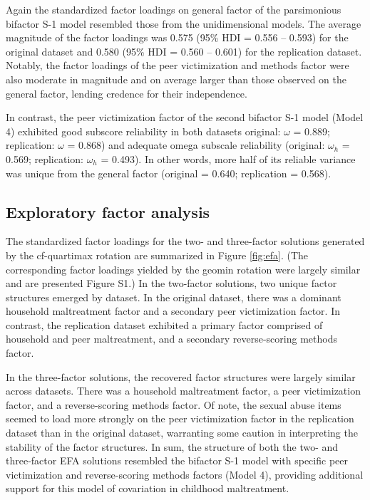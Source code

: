 \documentclass[letterpaper,man,natbib]{apa6}  %
\begin{document}
Again the standardized factor loadings on general factor of the parsimonious bifactor S-1 model resembled those from the unidimensional models. The average magnitude of the factor loadings was 0.575 (95\% HDI = 0.556 -- 0.593) for the original dataset and 0.580 (95\% HDI = 0.560 -- 0.601) for the replication dataset. Notably, the factor loadings of the peer victimization and methods factor were also moderate in magnitude and on average larger than those observed on the general factor, lending credence for their independence. 

In contrast, the peer victimization factor of the second bifactor S-1 model (Model 4) exhibited good subscore reliability in both datasets original: $\omega$ = 0.889; replication: $\omega$ = 0.868) and adequate omega subscale reliability (original: $\omega_h$ = 0.569; replication: $\omega_h$ = 0.493). In other words, more half of its reliable variance was unique from the general factor (original = 0.640; replication = 0.568). 

\subsection{Exploratory factor analysis}

The standardized factor loadings for the two- and three-factor solutions generated by the cf-quartimax rotation are summarized in Figure \ref{fig:efa}. (The corresponding factor loadings yielded by the geomin rotation were largely similar and are presented Figure S1.) In the two-factor solutions, two unique factor structures emerged by dataset. In the original dataset, there was a dominant household maltreatment factor and a secondary peer victimization factor. In contrast, the replication dataset exhibited a primary factor comprised of household and peer maltreatment, and a secondary reverse-scoring methods factor. 

In the three-factor solutions, the recovered factor structures were largely similar across datasets. There was a household maltreatment factor, a peer victimization factor, and a reverse-scoring methods factor. Of note, the sexual abuse items seemed to load more strongly on the peer victimization factor in the replication dataset than in the original dataset, warranting some caution in interpreting the stability of the factor structures. In sum, the structure of both the two- and three-factor EFA solutions resembled the bifactor S-1 model with specific peer victimization and reverse-scoring methods factors (Model 4), providing additional support for this model of covariation in childhood maltreatment. 
\end{document}
